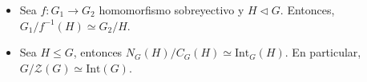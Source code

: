     \begin{coro}
        \begin{itemize}
        \item Sea $f: G_1 \rightarrow G_2$ homomorfismo sobreyectivo y $H \triangleleft G$. Entonces, $G_1 / f^{-1} \left( H \right) \simeq G_2 / H$.

        \item Sea $H \le G$, entonces $N_G\left( H \right) / C_G\left( H \right) \simeq \mathrm{Int}_G\left( H \right)$. En particular, $G/\mathcal{Z}\left( G \right) \simeq \mathrm{Int}\left( G \right)$.
        \end{itemize}
    \end{coro}
